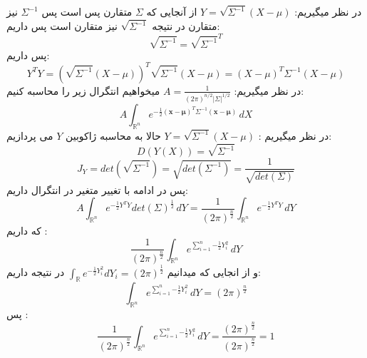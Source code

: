 \parte{}

\parte{}
در نظر میگیریم:
$Y = \sqrt{\Sigma ^{-1}}(X-\mu)$
از آنجایی که $\Sigma$ متقارن پس است پس $\Sigma^{-1}$ نیز متقارن 
در نتیجه $\sqrt{\Sigma^{-1}}$ نیز متقارن است پس داریم:\\
\[\sqrt{\Sigma^{-1}} = \sqrt{\Sigma^{-1}}^{T} \]
پس داریم:\\
\[ Y^{T}Y = (\sqrt{\Sigma ^{-1}}(X-\mu))^{T}\sqrt{\Sigma ^{-1}}(X-\mu) = (X-\mu)^{T}\Sigma^{-1}(X-\mu) \]
\parte{}
در نظر میگیریم:
$A = \frac{1}{{(2\pi)^{n/2} |\Sigma|^{1/2}}} $
میخواهیم انتگرال زیر را محاسبه کنیم:\\
\[
A \int_{\mathbb{R}^{n}} e^{-\frac{1}{2} (\mathbf{x}-\boldsymbol{\mu})^T \Sigma^{-1} (\mathbf{x}-\boldsymbol{\mu})} \, d{X}
\]
در نظر میگیریم : 
$Y = \sqrt{\Sigma ^{-1}}(X-\mu)$ حالا به محاسبه ژاکوبین $Y$  می پردازیم:\\

\[D(Y(X)) = \sqrt{\Sigma^{-1}}\]
\[J_{Y} = det(\sqrt{\Sigma^{-1}}) =\sqrt{det(\Sigma^{-1})} = \frac{1}{\sqrt{det(\Sigma)}} \]
پس در ادامه با تغییر متغیر در انتگرال داریم:\\
\[A \int_{\mathbb{R}^{n}} e^{-\frac{1}{2} Y^{T}Y} {det(\Sigma)}^{\frac{1}{2}}\, d{Y} = \frac{1}{(2\pi)^{\frac{n}{2}}}\int_{\mathbb{R}^{n}} e^{-\frac{1}{2} Y^{T}Y} \, d{Y}\]
که داریم :\\
\[ \frac{1}{(2\pi)^{\frac{n}{2}}}\int_{\mathbb{R}^{n}} e^{\sum_{i = 1}^{n}{-\frac{1}{2}Y_{i}^2} } \, d{Y} \]
و از انجایی که میدانیم $\int_{\mathbb{R}}{e^{-\frac{1}{2}Y_{i}^2}}d{Y_{i}} = (2\pi)^{\frac{1}{2}}$ در نتیجه داریم:
\[ \int_{\mathbb{R}^{n}} e^{\sum_{i = 1}^{n}{-\frac{1}{2}Y_{i}^2} } \, d{Y} = (2\pi)^{\frac{n}{2}}\] پس :\\

\[ \frac{1}{(2\pi)^{\frac{n}{2}}}\int_{\mathbb{R}^{n}} e^{\sum_{i = 1}^{n}{-\frac{1}{2}Y_{i}^2} } \, d{Y}  = \frac{(2\pi)^{\frac{n}{2}}}{(2\pi)^{\frac{n}{2}}} = 1\]

